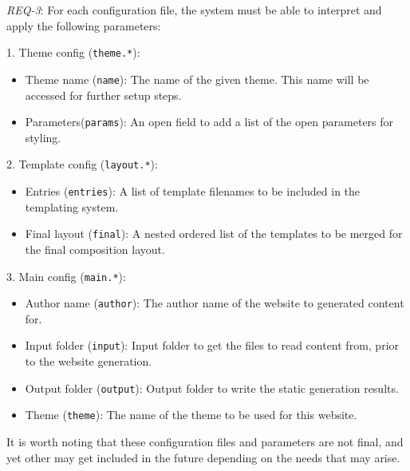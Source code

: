 \emph{REQ-3}: For each configuration file, the system must be able to
interpret and apply the following parameters:


1. Theme config (\texttt{theme.*}):


\begin{itemize}
    \item
    Theme name (\texttt{name}): The name of the given theme. This name
    will be accessed for further setup steps.
    \item
    Parameters(\texttt{params}): An open field to add a list of the open
    parameters for styling.
\end{itemize}

2. Template config (\texttt{layout.*}):

\begin{itemize}
    \item
    Entries (\texttt{entries}): A list of template filenames to be
    included in the templating system.
    \item
    Final layout (\texttt{final}): A nested ordered list of the templates
    to be merged for the final composition layout.
\end{itemize}

3. Main config (\texttt{main.*}):

\begin{itemize}
    \item
    Author name (\texttt{author}): The author name of the website to
    generated content for.
    \item
    Input folder (\texttt{input}): Input folder to get the files to read
    content from, prior to the website generation.
    \item
    Output folder (\texttt{output}): Output folder to write the static
    generation results.
    \item
    Theme (\texttt{theme}): The name of the theme to be used for this
    website.
\end{itemize}

It is worth noting that these configuration files and parameters are not
final, and yet other may get included in the future depending on the
needs that may arise.
